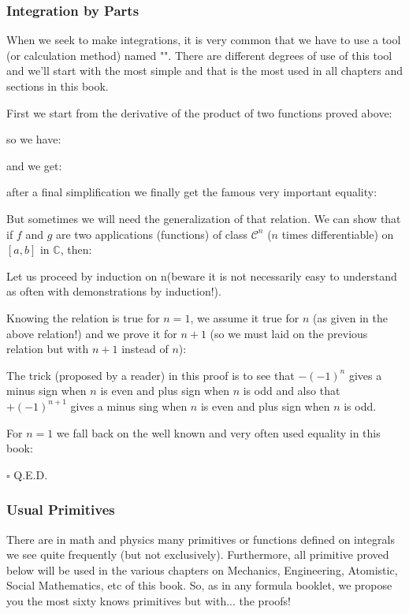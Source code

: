 	\subsubsection{Integration by Parts}\label{integration by parts}
	When we seek to make integrations, it is very common that we have to use a tool (or calculation method) named "". There are different degrees of use of this tool and we'll start with the most simple and that is the most used in all chapters and sections in this book.
	
	First we start from the derivative of the product of two functions proved above:
	
	
	so we have:
	
	and we get:
	
	after a final simplification we finally get the famous very important equality:
	
	But sometimes we will need the generalization of that relation. We can show that if $f$ and $g$ are two applications (functions) of class $\mathcal{C}^n$ ($n$ times differentiable) on $[a, b]$ in $\mathbb{C}$, then:
	
	\begin{dem}
	Let us proceed by induction on n$ $(beware it is not necessarily easy to understand as often with demonstrations by induction!).
	
	Knowing the relation is true for $n = 1$, we assume it true for $n$ (as given in the above relation!) and we prove it for $n + 1$ (so we must laid on the previous relation but with $n + 1$ instead of $n$):
	
	\begin{tcolorbox}[title=Remark,colframe=black,arc=10pt]
	The trick (proposed by a reader) in this proof is to see that $-(-1)^n$ gives a minus sign when $n$ is even and plus sign when $n$ is odd and also that $+(-1)^{n+1}$ gives a minus sing when $n$ is even and plus sign when $n$ is odd.
	\end{tcolorbox}
	For $n = 1$ we fall back on the well known and very often used equality in this book:
	
	\begin{flushright}
		$\square$  Q.E.D.
	\end{flushright}
	\end{dem}

	\pagebreak
	\subsubsection{Usual Primitives}\label{usual primitives}
	There are in math and physics many primitives or functions defined on integrals we see  quite frequently (but not exclusively). Furthermore, all primitive proved below will be used in the various chapters on Mechanics, Engineering, Atomistic, Social Mathematics, etc of this book. So, as in any formula booklet, we propose you the most sixty knows primitives but with... the proofs!
	
